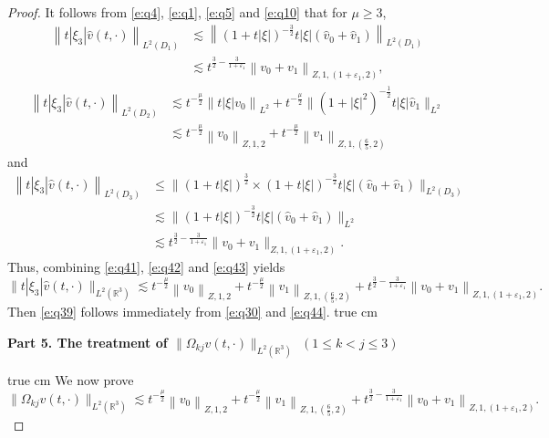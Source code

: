 \documentclass[11pt,twoside]{article}
\newcommand{\R}{\mathbb R}
\newcommand{\f}{\frac}
\theoremstyle{plain}
\theoremstyle{definition}
\theoremstyle{remark}
\numberwithin{equation}{section}
\begin{document}
\begin{proof}
It follows from  \eqref{e:q4}, \eqref{e:q1}, \eqref{e:q5} and  \eqref{e:q10} that for $\mu\geq3$,
\begin{equation}\label{e:q41}
\begin{aligned}
\left\|t|\xi_3|\hat{v}(t, \cdot)\right\|_{L^2(D_1)} & \lesssim\left\|(1+t|\xi|)^{-\f32}t|\xi|(\hat{v}_{0}+\hat{v}_{1})\right\|_{L^{2}(D_1)} \\
& \lesssim t^{\f32-\f{3}{1+\varepsilon_1}}\left\|v_0+v_1\right\|_{Z, 1,(1+\varepsilon_1, 2)},
\end{aligned}
\end{equation}
\begin{equation}\label{e:q42}
\begin{aligned}
\left\|t|\xi_3|\hat{v}(t, \cdot)\right\|_{L^2(D_2)}
& \lesssim t^{-\frac{\mu}{2}}\left\|t|\xi|v_{0}\right\|_{L^{2}}+t^{-\f{\mu}{2}} \|(1+|\xi|^2)^{-\f{1}{2}}t|\xi|\hat{v}_{1}\|_{L^{2}}\\
&\lesssim t^{-\f{\mu}{2}}\left\|v_0\right\|_{Z, 1, 2}+t^{-\f{\mu}{2}}\left\|v_1\right\|_{Z, 1,(\f65, 2)}
\end{aligned}
\end{equation}
and
\begin{equation}\label{e:q43}
\begin{aligned}
\left\|t|\xi_3|\hat{v}(t, \cdot)\right\|_{L^2(D_3)} & \leq\big\|(1+t|\xi|)^{\f32}\times(1+t|\xi|)^{-\f32}t|\xi|(\hat{v}_{0}+\hat{v}_{1})\big\|_{L^{2}(D_3)} \\
&\lesssim\big\|(1+t|\xi|)^{-\f32}t|\xi|(\hat{v}_{0}+\hat{v}_{1})\big\|_{L^{2}}\\
&\lesssim t^{\f32-\f{3}{1+\varepsilon_1}}\|v_0+v_1\|_{Z, 1, (1+\varepsilon_1, 2)}.
\end{aligned}
\end{equation}
Thus, combining \eqref{e:q41}, \eqref{e:q42} and \eqref{e:q43} yields
\begin{equation}\label{e:q44}
\|t|\xi_3|\hat{v}(t, \cdot)\|_{L^2(\R^3)} \lesssim t^{-\f{\mu}{2}}\left\|v_0\right\|_{Z, 1, 2}
+t^{-\f{\mu}{2}}\left\|v_1\right\|_{Z, 1,(\f65, 2)}+t^{\f32-\f{3}{1+\varepsilon_1}}\left\|v_0+v_1\right\|_{Z, 1,(1+\varepsilon_1, 2)}.
\end{equation}
Then \eqref{e:q39} follows immediately from \eqref{e:q30} and \eqref{e:q44}.
 true cm

{\bf Part 5.  The treatment of $\|\Omega_{kj}v(t, \cdot)\|_{L^2(\R^3)}$ $(1\le k<j\le3)$ }

 true cm
We now prove
\begin{equation}\label{e:q45}
\|\Omega_{kj}v(t, \cdot)\|_{L^2(\R^3)} \lesssim t^{-\f{\mu}{2}}\left\|v_0\right\|_{Z, 1, 2}+t^{-\f{\mu}{2}}\left\|v_1\right\|_{Z, 1,(\f65, 2)}+t^{\f32-\f{3}{1+\varepsilon_1}}\left\|v_0+v_1\right\|_{Z, 1,(1+\varepsilon_1, 2)}.
\end{equation}



\end{proof}
\end{document}
